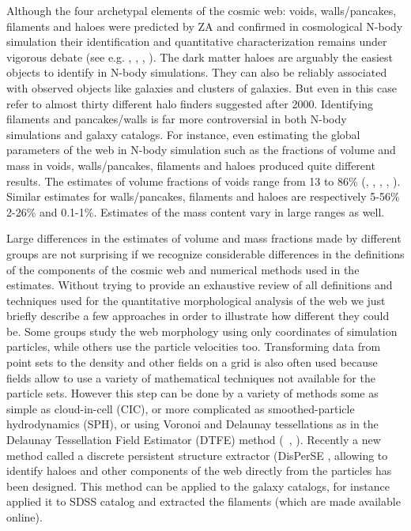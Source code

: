   
Although the four archetypal elements of the cosmic web:  voids, walls/pancakes, filaments and haloes 
were predicted by ZA and confirmed in cosmological N-body simulation their identification and quantitative characterization
remains under vigorous debate
(see e.g. \citealt{Colberg2008}, \citealt{Elahi2013}, \citealt{Knebe2013}, \citealt{Hoffmann2014}).
The dark matter haloes are arguably the easiest objects to identify in N-body simulations. They can also be reliably associated with
observed objects like galaxies and clusters of galaxies.  But even in this case \citet{Knebe2013} refer to almost thirty different
halo finders suggested after 2000. Identifying filaments and pancakes/walls is far more controversial in both N-body simulations 
and galaxy catalogs. For instance, even estimating the global parameters of the  web  in N-body simulation such as the fractions of volume and mass
in voids, walls/pancakes, filaments and haloes produced quite different results. The estimates of volume 
fractions of voids range from 13  to 86\%  (\citealt{Cautun2014a}, \citealt{Falck2015}, \citealt{Forero-Romero2009a} , \citealt{Hahn2007} , \citealt{Aragon-Calvo2010a}). Similar estimates for walls/pancakes, filaments 
and haloes  are respectively 5-56\% 2-26\% and 0.1-1\%.  Estimates of the mass content vary in large ranges as well.

Large differences in the estimates of volume and mass fractions made by different groups are not surprising if we recognize
considerable differences in the definitions of the components of the cosmic web and numerical methods used in the estimates. Without trying to provide an exhaustive review of all definitions and techniques used for the quantitative morphological 
analysis of the web  we just briefly describe a few approaches in order to illustrate how different they could be. 
Some groups study the web morphology using only coordinates of simulation particles, while others use the particle velocities too. 
Transforming data from  point sets to the density and other fields on a grid is also often used
because fields allow to use a variety of mathematical techniques not available for the particle sets.
However this step can be done by a variety of methods some as simple as cloud-in-cell (CIC), or more complicated as smoothed-particle hydrodynamics (SPH), 
or using Voronoi and Delaunay tessellations
as in the Delaunay Tessellation Field Estimator (DTFE) method (~\citealt{Weygaert2009}, \citealt{Cautun2014a}).  
Recently a new method called a discrete persistent structure extractor (DisPerSE \citealt{Sousbie2011f},  \citealt{Sousbie2011e} allowing to identify haloes and other components of the web directly from the particles 
has been designed.  This method can be applied to the galaxy catalogs, for instance \citet{Sousbie2011e} applied it to SDSS catalog and extracted the filaments (which are made available online).

